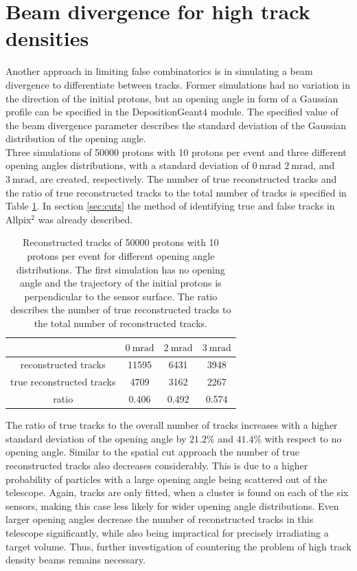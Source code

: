 \section{Beam divergence for high track densities}
Another approach in limiting false combinatorics is in simulating a beam divergence to differentiate between tracks. Former simulations had no variation
in the direction of the initial protons, but an opening angle in form of a Gaussian profile can be specified in the DepositionGeant4 module. The specified value of
the beam divergence parameter describes the standard deviation of the Gaussian distribution of the opening angle.  \\
Three simulations of 50000 protons with 10 protons per event and three different opening angles distributions, with a standard deviation of $\SI{0}{\milli\radian}$
$\SI{2}{\milli\radian}$, and $\SI{3}{\milli\radian}$, are created, respectively.
The number of true reconstructed tracks and the ratio
of true reconstructed tracks to the total number of tracks is specified in Table \ref{tab:angle}. In section \ref{sec:cuts} the method of identifying
true and false tracks in Allpix$^2$ was already described.

\begin{table}
  \centering
  \caption{Reconstructed tracks of 50000 protons with 10 protons per event for different opening angle
  distributions. The first simulation has no opening angle and the trajectory of the initial protons is perpendicular to the sensor surface.
  The ratio describes the number of true reconstructed tracks to the total number of reconstructed tracks.}
  \begin{tabular}{c | c c c}
    \toprule
     &  $\SI{0}{\milli\radian}$ & $\SI{2}{\milli\radian}$ & $\SI{3}{\milli\radian}$\\
    \midrule
    reconstructed tracks & 11595 & 6431 & 3948  \\
    true reconstructed tracks & 4709 & 3162 & 2267 \\
    ratio & 0.406 & 0.492 & 0.574
  \end{tabular}
  \label{tab:angle}
\end{table}

The ratio of true tracks to the overall number of tracks increases with a higher standard deviation of the opening angle by $21.2\%$ and $41.4\%$ with respect to
no opening angle. Similar to the spatial cut approach the
number of true reconstructed tracks also decreases considerably. This is due to a higher probability of particles with a large opening angle being scattered out of the telescope.
Again, tracks are only fitted, when a cluster is found on each of the six sensors, making this case less likely for wider opening angle distributions.
Even larger opening angles decrease the number of reconstructed tracks in this telescope significantly, while also being impractical for precisely irradiating a target volume.
Thus, further investigation of countering the problem of high track density beams remains necessary.

